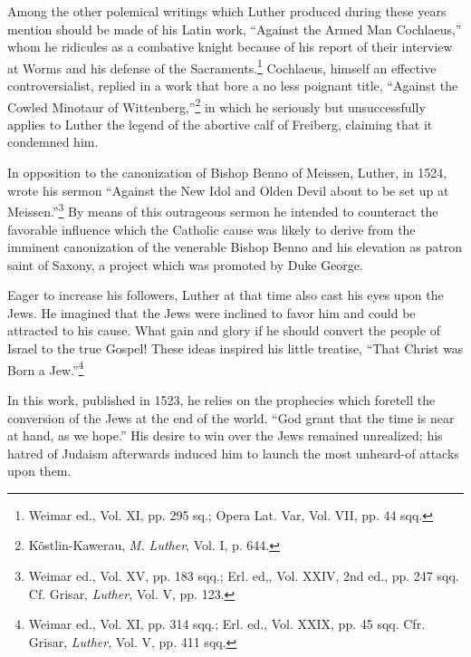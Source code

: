 Among the other polemical writings which Luther produced during these
years mention should be made of his Latin work, “Against
the Armed Man Cochlaeus,” whom he ridicules as a combative
knight because of his report of their interview at Worms and his
defense of the Sacraments.\footnote{Weimar ed., Vol. XI, pp. 295 sq.; Opera Lat. Var, Vol. VII, pp. 44 sqq.}
Cochlaeus, himself an effective controversialist,
replied in a work that bore a no less poignant title,
“Against the Cowled Minotaur of Wittenberg,”\footnote
{Köstlin-Kawerau, \textit{M. Luther}, Vol. I, p. 644.}
in which he
seriously but unsuccessfully applies to Luther the legend of the abortive
calf of Freiberg, claiming that it condemned him.

In opposition to the canonization of Bishop Benno of Meissen,
Luther, in 1524, wrote his sermon “Against the New Idol and Olden
Devil about to be set up at Meissen.”\footnote
{Weimar ed., Vol. XV, pp. 183 sqq.; Erl. ed,, Vol. XXIV, 2nd ed., pp. 247 sqq. Cf.
Grisar, \textit{Luther}, Vol. V, pp. 123.}
By means of this outrageous
sermon he intended to counteract the favorable influence which the
Catholic cause was likely to derive from the imminent canonization
of the venerable Bishop Benno and his elevation as patron saint of
Saxony, a project which was promoted by Duke George.

Eager to increase his followers, Luther at that time also cast his
eyes upon the Jews. He imagined that the Jews were inclined to
favor him and could be attracted to his cause. What gain and glory if
he should convert the people of Israel to the true Gospel! These ideas
inspired his little treatise, “That Christ was Born a Jew.”\footnote
{Weimar ed., Vol. XI, pp. 314 sqq.; Erl. ed., Vol. XXIX, pp. 45 sqq. Cfr. Grisar,
\textit{Luther}, Vol. V, pp. 411 sqq.}

In this
work, published in 1523, he relies on the prophecies which foretell the
conversion of the Jews at the end of the world. “God grant that the
time is near at hand, as we hope.” His desire to win over the Jews
remained unrealized; his hatred of Judaism afterwards induced him
to launch the most unheard-of attacks upon them.

